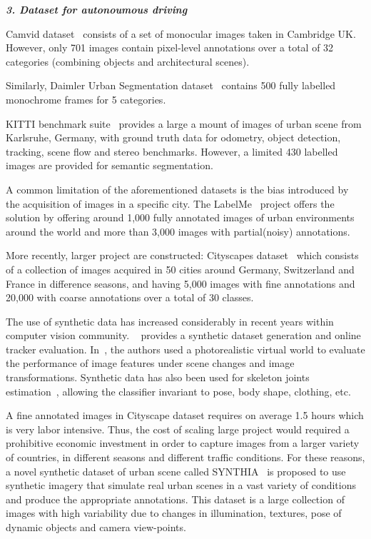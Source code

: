 \documentclass[10pt,twocolumn,letterpaper]{article}
\begin{document}
\textbf{\emph{3. Dataset for autonoumous driving}}

Camvid dataset~\cite{Camvid} consists of a set of monocular images taken in Cambridge UK. However, only 701 images contain pixel-level annotations over a total of 32 categories (combining objects and architectural scenes).

Similarly, Daimler Urban Segmentation dataset~\cite{scharwachter2013efficient} contains 500 fully labelled monochrome frames for 5 categories.

KITTI benchmark suite~\cite{Geiger2013IJRR} provides a large a mount of images of urban scene from Karlsruhe, Germany, with ground truth data for odometry, object detection, tracking, scene flow and stereo benchmarks. However, a limited 430 labelled images are provided for semantic segmentation.

A common limitation of the aforementioned datasets is the bias introduced by the acquisition of images in a specific city. The LabelMe~\cite{russell2008labelme} project offers the solution by offering around 1,000 fully annotated images of urban environments around the world and more than 3,000 images with partial(noisy) annotations.

More recently, larger project are constructed:
Cityscapes dataset~\cite{Cordts2016Cityscapes} which consists of a collection of images acquired in 50 cities around Germany, Switzerland and France in difference seasons, and having 5,000 images with fine annotations and 20,000 with coarse annotations over a total of 30 classes.

The use of synthetic data has increased considerably in recent years within computer vision community. ~\cite{mueller2016benchmark} provides a synthetic dataset generation and online tracker evaluation. In~\cite{kaneva2011evaluation}, the authors used a photorealistic virtual world to evaluate the performance of image features under scene changes and image transformations. Synthetic data has also been used for skeleton joints estimation~\cite{shotton2013real}, allowing the classifier invariant to pose, body shape, clothing, etc.

A fine annotated images in Cityscape dataset requires on average 1.5 hours which is very labor intensive. Thus, the cost of scaling large project would required a prohibitive economic investment in order to capture images from a larger variety of countries, in different seasons and different traffic conditions. For these reasons, a novel synthetic dataset of urban scene called SYNTHIA~\cite{ros2016synthia} is proposed to use synthetic imagery that simulate real urban scenes in a vast variety of conditions and produce the appropriate annotations.
This dataset is a large collection of images with high variability due to changes in illumination, textures, pose of dynamic objects and camera view-points.
\end{document}
